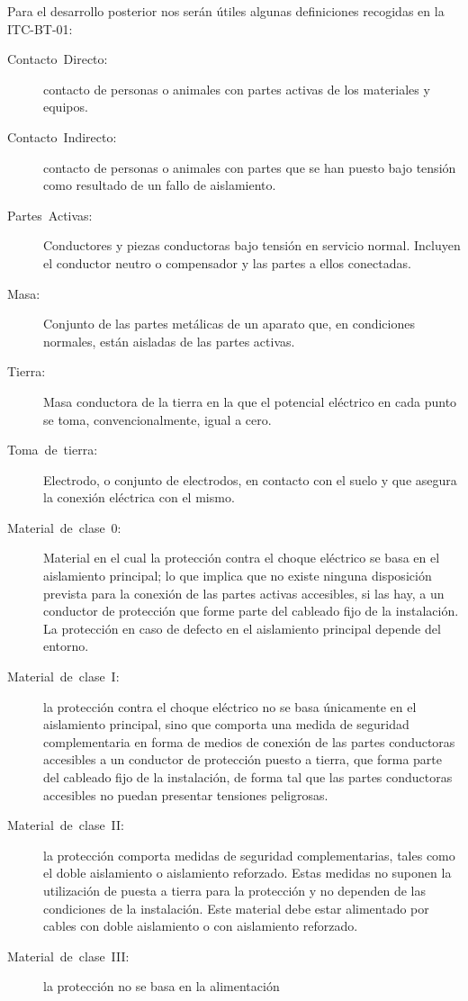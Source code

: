 Para el desarrollo posterior nos serán útiles algunas definiciones
recogidas en la ITC-BT-01:
\begin{description}
\item [{Contacto~Directo:}] contacto de personas o animales con partes
activas de los materiales y equipos.
\item [{Contacto~Indirecto:}] contacto de personas o animales con partes
que se han puesto bajo tensión como resultado de un fallo de aislamiento.
\item [{Partes~Activas:}] Conductores y piezas conductoras bajo tensión
en servicio normal. Incluyen el conductor neutro o compensador y las
partes a ellos conectadas.
\item [{Masa:}] Conjunto de las partes metálicas de un aparato que, en
condiciones normales, están aisladas de las partes activas.
\item [{Tierra:}] Masa conductora de la tierra en la que el potencial eléctrico
en cada punto se toma, convencionalmente, igual a cero.
\item [{Toma~de~tierra:}] Electrodo, o conjunto de electrodos, en contacto
con el suelo y que asegura la conexión eléctrica con el mismo.
\item [{Material~de~clase~0:}] Material en el cual la protección contra
el choque eléctrico se basa en el aislamiento principal; lo que implica
que no existe ninguna disposición prevista para la conexión de las
partes activas accesibles, si las hay, a un conductor de protección
que forme parte del cableado fijo de la instalación. La protección
en caso de defecto en el aislamiento principal depende del entorno.
\item [{Material~de~clase~I:}] la protección contra el choque eléctrico
no se basa únicamente en el aislamiento principal, sino que comporta
una medida de seguridad complementaria en forma de medios de conexión
de las partes conductoras accesibles a un conductor de protección
puesto a tierra, que forma parte del cableado fijo de la instalación,
de forma tal que las partes conductoras accesibles no puedan presentar
tensiones peligrosas.
\item [{Material~de~clase~II:}] la protección comporta medidas de seguridad
complementarias, tales como el doble aislamiento o aislamiento reforzado.
Estas medidas no suponen la utilización de puesta a tierra para la
protección y no dependen de las condiciones de la instalación. Este
material debe estar alimentado por cables con doble aislamiento o
con aislamiento reforzado.
\item [{Material~de~clase~III:}] la protección no se basa en la alimentación

\end{description}
